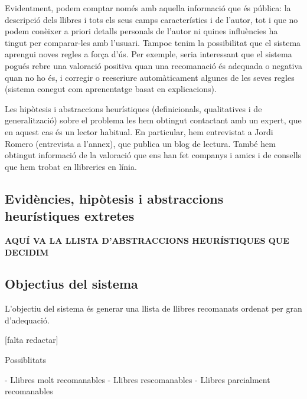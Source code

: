 Evidentment, podem comptar només amb aquella informació que és pública: la descripció dels llibres i tots els seus camps característics i de l'autor, tot i que no podem conèixer a priori detalls personals de l'autor ni quines influències ha tingut per comparar-les amb l'usuari. Tampoc tenim la possibilitat que el sistema aprengui noves regles a força d'ús. Per exemple, seria interessant que el sistema pogués rebre una valoració positiva quan una recomanació és adequada o negativa quan no ho és, i corregir o reescriure automàticament algunes de les seves regles (sistema conegut com aprenentatge basat en explicacions).

Les hipòtesis i abstraccions heurístiques (definicionals, qualitatives i de generalització) sobre el problema les hem obtingut contactant amb un expert, que en aquest cas és un lector habitual. En particular, hem entrevistat a Jordi Romero (entrevista a l'annex), que publica un blog de lectura. També hem obtingut informació de la valoració que ens han fet companys i amics i de consells que hem trobat en llibreries en línia.


\subsection{Evidències, hipòtesis i abstraccions heurístiques extretes}

\textbf{AQUÍ VA LA LLISTA D'ABSTRACCIONS HEURÍSTIQUES QUE DECIDIM}

\subsection{Objectius del sistema}

L'objectiu del sistema és generar una llista de llibres recomanats ordenat per gran d'adequació.

[falta redactar]

Possiblitats 

- Llibres molt recomanables
- Llibres rescomanables
- Llibres parcialment recomanables



